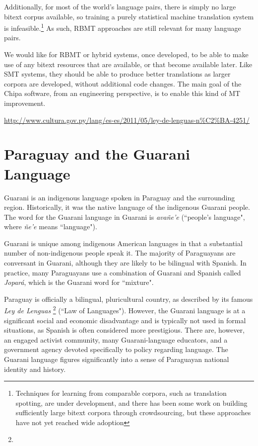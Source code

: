 Additionally, for most of the world's language pairs, there is simply no large
bitext corpus available, so training a purely statistical machine translation
system is infeasible.\footnote{Techniques for learning from comparable corpora,
such as translation spotting, are under development, and there has been some
work on building sufficiently large bitext corpora through crowdsourcing, but
these approaches have not yet reached wide adoption}
As such, RBMT approaches are still relevant for many language pairs.

We would like for RBMT or hybrid systems, once developed, to be able to make
use of any bitext resources that are available, or that become available later.
Like SMT systems, they should be able to produce better translations as larger
corpora are developed, without additional code changes.
The main goal of the Chipa software, from an engineering perspective, is to
enable this kind of MT improvement.

\urldef{\leydelenguas}\url{http://www.cultura.gov.py/lang/es-es/2011/05/ley-de-lenguas-n%C2%BA-4251/}

\section{Paraguay and the Guarani Language}
Guarani is an indigenous language spoken in Paraguay and the surrounding
region.
Historically, it was the native language of the indigenous Guarani people. The
word for the Guarani language in Guarani is \emph{avañe'e} (``people's
language", where \emph{ñe'e} means ``language").

Guarani is unique among indigenous American languages in that a substantial
number of non-indigenous people speak it.  The majority of Paraguayans are
conversant in Guarani, although they are likely to be bilingual with Spanish.
In practice, many Paraguayans use a combination of Guarani and Spanish called
\emph{Jopar{\'a}}, which is the Guarani word for ``mixture".

Paraguay is officially a bilingual, pluricultural country, as described by its
famous \emph{Ley de Lenguas} \footnote{\leydelenguas} (``Law of Languages").
However, the Guarani language is at a significant social and economic
disadvantage and is typically not used in formal situations, as Spanish is
often considered more prestigious. There are, however, an engaged activist
community, many Guarani-language educators, and a government agency devoted
specifically to policy regarding language.
The Guarani language figures significantly into a sense of Paraguayan national
identity and history.

